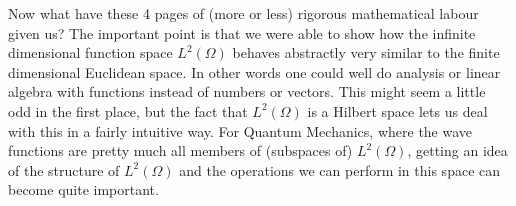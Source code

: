 \begin{rem}
	Now what have these 4 pages of (more or less) rigorous mathematical labour given us?
	The important point is that we were able to show how the infinite dimensional function space $L^2(\Omega)$ behaves abstractly very similar to the finite dimensional Euclidean space.
	In other words one could well do analysis or linear algebra with functions instead of numbers or vectors. 
	This might seem a little odd in the first place, but the fact that $L^2(\Omega)$ is a Hilbert space lets us deal with this in a fairly intuitive way.
	For Quantum Mechanics, where the wave functions are pretty much all members of (subspaces of) $L^2(\Omega)$, getting an idea of the structure of $L^2(\Omega)$ and the operations we can perform in this space can become quite important.
\end{rem}
